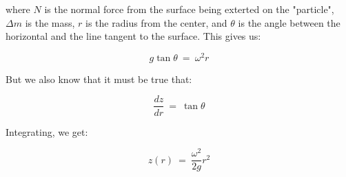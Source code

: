 \documentclass[10pt, oneside]{article}
\begin{document}
where $N$ is the normal force from the surface being exterted on the "particle", $\Delta m$ is the mass, $r$ is the radius 
from the center, and $\theta$ is the angle between the horizontal and the line tangent to the surface.
\newline\newline
This gives us:

$$ g \tan \theta \ = \ \omega^2 r$$

But we also know that it must be true that:

$$\frac{dz}{dr} \ = \ \tan \theta$$

Integrating, we get:

$$z(r) \ = \ \frac{\omega^2}{2g} r^2$$
\end{document}
